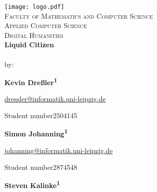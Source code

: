 \begin{titlepage}	%
	\begin{center}
		\libertineOsF
		\vspace*{0.1cm}
		\texttt{[image: logo.pdf]}\\[0.75cm]
		\normalsize{\textsc{Faculty of Mathematics and Computer Science\\Applied Computer Science\\Digital Humanities}}\\[1.25cm]
		\huge{\textbf{Liquid Citizen}}\\[0.75cm]
		\normalsize{\\[1cm]
			by:}
		
	\vspace*{\fill} 
	\begin{minipage}[t]{.6\textwidth}
		\large{\textbf{Kevin Dreßler\textsuperscript{1}}} \vspace*{0.3cm}
		
		\begin{normalsize}
			\href{mailto:dressler@informatik.uni-leipzig.de}{dressler@informatik.uni-leipzig.de} %
			
			\libertineLF
			{\footnotesize Student number\enspace{}2504145} \vspace*{1cm}
		\end{normalsize}
	\end{minipage}%
	\begin{minipage}[t]{.4\textwidth}
		\large{\textbf{Simon Johanning\textsuperscript{1}}} \vspace*{0.3cm}
		
		\begin{normalsize}
			\href{mailto:johanning@informatik.uni-leipzig.de}{johanning@informatik.uni-leipzig.de} %
			
			\libertineLF
			{\footnotesize Student number\enspace{}2874548} \vspace*{1cm}
		\end{normalsize}
	\end{minipage}
		\begin{minipage}[t]{.6\textwidth}
		\large{\textbf{Steven Kalinke\textsuperscript{1}}} \vspace*{0.3cm}
		

\end{minipage}
\end{center}
\end{titlepage}
